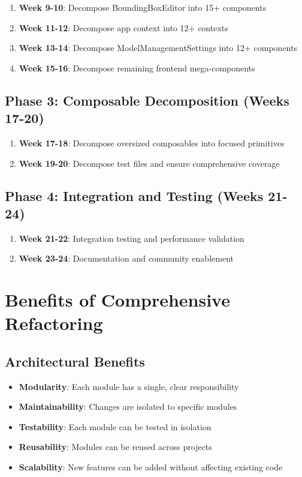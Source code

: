 \documentclass[11pt]{article}
\begin{document}
\begin{enumerate}
\item \textbf{Week 9-10}: Decompose BoundingBoxEditor into 15+ components
\item \textbf{Week 11-12}: Decompose app context into 12+ contexts
\item \textbf{Week 13-14}: Decompose ModelManagementSettings into 12+ components
\item \textbf{Week 15-16}: Decompose remaining frontend mega-components
\end{enumerate}

\subsection{Phase 3: Composable Decomposition (Weeks 17-20)}

\begin{enumerate}
\item \textbf{Week 17-18}: Decompose oversized composables into focused primitives
\item \textbf{Week 19-20}: Decompose test files and ensure comprehensive coverage
\end{enumerate}

\subsection{Phase 4: Integration and Testing (Weeks 21-24)}

\begin{enumerate}
\item \textbf{Week 21-22}: Integration testing and performance validation
\item \textbf{Week 23-24}: Documentation and community enablement
\end{enumerate}

\section{Benefits of Comprehensive Refactoring}

\subsection{Architectural Benefits}

\begin{itemize}
\item \textbf{Modularity}: Each module has a single, clear responsibility
\item \textbf{Maintainability}: Changes are isolated to specific modules
\item \textbf{Testability}: Each module can be tested in isolation
\item \textbf{Reusability}: Modules can be reused across projects
\item \textbf{Scalability}: New features can be added without affecting existing code
\end{itemize}
\end{document}
